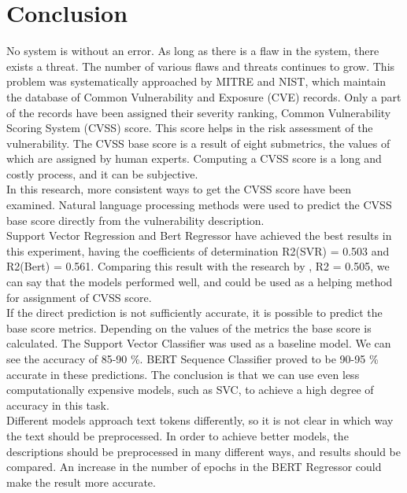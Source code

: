 \documentclass[times, utf8, zavrsni, english]{fer}
\begin{document}
\chapter{Conclusion}
No system is without an error. As long as there is a flaw in the system, there exists a threat. The number of various flaws and threats continues to grow. This problem was systematically approached by MITRE and NIST, which maintain the database of Common Vulnerability and Exposure (CVE) records. Only a part of the records have been assigned their severity ranking, Common Vulnerability Scoring System (CVSS) score. This score helps in the risk assessment of the vulnerability. The CVSS base score is a result of eight submetrics, the values of which are assigned by human experts. Computing a CVSS score is a long and costly process, and it can be subjective. \\

In this research, more consistent ways to get the CVSS score have been examined. Natural language processing methods were used to predict the CVSS base score directly from the vulnerability description.\\
Support Vector Regression and Bert Regressor have achieved the best results in this experiment, having the coefficients of determination R2(SVR) = 0.503 and R2(Bert) = 0.561. Comparing this result with the research by \citep{vulnerwatch}, R2 = 0.505, we can say that the models performed well, and could be used as a helping method for assignment of CVSS score. \\
If the direct prediction is not sufficiently accurate, it is possible to predict the base score metrics. Depending on the values of the metrics the base score is calculated. The Support Vector Classifier was used as a baseline model. We can see the accuracy of 85-90 \%. BERT Sequence Classifier proved to be 90-95 \% accurate in these predictions. The conclusion is that we can use even less computationally expensive models, such as SVC, to achieve a high degree of accuracy in this task.\\

Different models approach text tokens differently, so it is not clear in which way the text should be preprocessed. 
In order to achieve better models, the descriptions should be preprocessed in many different ways, and results should be compared.
An increase in the number of epochs in the BERT Regressor could make the result more accurate. 



\end{document}
